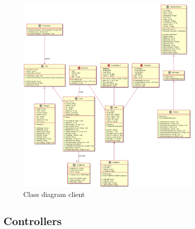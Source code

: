 \documentclass[12pt, a4paper]{report}
\begin{document}
\begin{figure}[h]
  \centering
  \includegraphics[width=0.8\textwidth]{client_models_class.png}
  \caption{Class diagram client}
\end{figure}


\subsection{Controllers}
\end{document}
